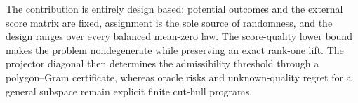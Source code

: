 The contribution is entirely design based: potential outcomes and the external score matrix are fixed, assignment is the sole source of randomness, and the design ranges over every balanced mean-zero law.  The score-quality lower bound makes the problem nondegenerate while preserving an exact rank-one lift.  The projector diagonal then determines the admissibility threshold through a polygon--Gram certificate, whereas oracle risks and unknown-quality regret for a general subspace remain explicit finite cut-hull programs.
